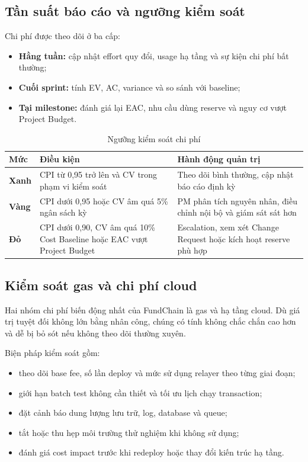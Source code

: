 \subsection{Tần suất báo cáo và ngưỡng kiểm soát}

Chi phí được theo dõi ở ba cấp:

\begin{itemize}
  \item \textbf{Hằng tuần:} cập nhật effort quy đổi, usage hạ tầng và sự kiện chi phí bất thường;
  \item \textbf{Cuối sprint:} tính EV, AC, variance và so sánh với baseline;
  \item \textbf{Tại milestone:} đánh giá lại EAC, nhu cầu dùng reserve và nguy cơ vượt Project Budget.
\end{itemize}

\begin{table}[H]
\centering
\caption{Ngưỡng kiểm soát chi phí}
\label{tab:cost-thresholds}
\begin{tabularx}{\textwidth}{| >{\bfseries}p{2.6cm} | p{4.8cm} | X |}
\hline
Mức & Điều kiện & Hành động quản trị \\
\hline
Xanh & CPI từ 0,95 trở lên và CV trong phạm vi kiểm soát & Theo dõi bình thường, cập nhật báo cáo định kỳ \\ \hline
Vàng & CPI dưới 0,95 hoặc CV âm quá 5\% ngân sách kỳ & PM phân tích nguyên nhân, điều chỉnh nội bộ và giám sát sát hơn \\ \hline
Đỏ & CPI dưới 0,90, CV âm quá 10\% Cost Baseline hoặc EAC vượt Project Budget & Escalation, xem xét Change Request hoặc kích hoạt reserve phù hợp \\
\hline
\end{tabularx}
\end{table}

\subsection{Kiểm soát gas và chi phí cloud}

Hai nhóm chi phí biến động nhất của FundChain là gas và hạ tầng cloud. Dù giá trị tuyệt đối không lớn bằng nhân công, chúng có tính không chắc chắn cao hơn và dễ bị bỏ sót nếu không theo dõi thường xuyên.

Biện pháp kiểm soát gồm:

\begin{itemize}
  \item theo dõi base fee, số lần deploy và mức sử dụng relayer theo từng giai đoạn;
  \item giới hạn batch test không cần thiết và tối ưu lịch chạy transaction;
  \item đặt cảnh báo dung lượng lưu trữ, log, database và queue;
  \item tắt hoặc thu hẹp môi trường thử nghiệm khi không sử dụng;
  \item đánh giá cost impact trước khi redeploy hoặc thay đổi kiến trúc hạ tầng.
\end{itemize}

